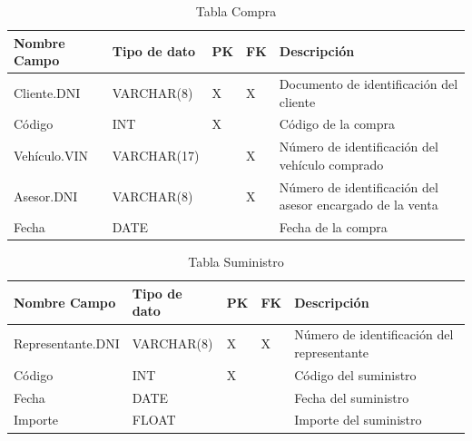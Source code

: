 \documentclass[12pt]{article}
\begin{document}
\begin{table}[htbp]
    \begin{center}
        \begin{tabular}{|p{3cm}|p{3cm}|p{1cm}|p{1cm}|p{6cm}|}
            \hline
            Nombre Campo & Tipo de dato & PK & FK & Descripción \\
            \hline
            Cliente.DNI & VARCHAR(8) & X & X & Documento de identificación del cliente\\
            Código & INT & X &  & Código de la compra \\
            Vehículo.VIN & VARCHAR(17) &  & X & Número de identificación del vehículo comprado \\
            Asesor.DNI & VARCHAR(8) &  & X & Número de identificación del asesor encargado de la venta \\
            Fecha & DATE &  &  & Fecha de la compra \\
            \hline
        \end{tabular}
        \caption{Tabla Compra}
        \label{tab:tablas}
    \end{center}
\end{table}


\begin{table}[htbp]
    \begin{center}
        \begin{tabular}{|p{3cm}|p{3cm}|p{1cm}|p{1cm}|p{6cm}|}
            \hline
            Nombre Campo & Tipo de dato & PK & FK & Descripción \\
            \hline
            Representante.DNI & VARCHAR(8) & X & X & Número de identificación del representante \\
            Código & INT & X &  & Código del suministro \\
            Fecha & DATE &  &  & Fecha del suministro \\
            Importe & FLOAT &  &  & Importe del suministro \\
            \hline
            \end{tabular}
        \caption{Tabla Suministro}
        \label{tab:tablas}
    \end{center}
\end{table}
\end{document}
